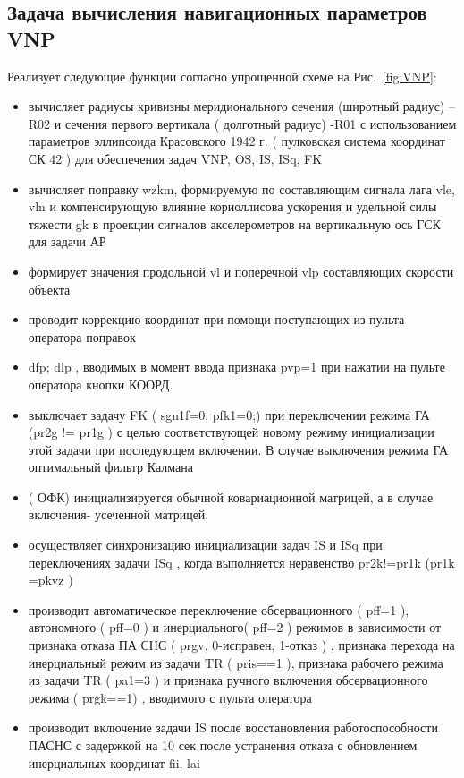 \subsection{Задача вычисления навигационных параметров VNP}
Реализует следующие функции согласно упрощенной схеме на Рис.~\ref{fig:VNP}:
\begin{itemize}
\item вычисляет радиусы кривизны  меридионального сечения (широтный радиус) –R02  и сечения первого вертикала ( долготный радиус) -R01  
    с использованием параметров эллипсоида Красовского 1942 г.  ( пулковская система координат СК 42  )  для  обеспечения   задач 
    VNP,  OS,  IS,  ISq,  FK 
    \item вычисляет  поправку   wzkm,  формируемую по  составляющим  сигнала  лага  vle,  vln  и компенсирующую  влияние кориоллисова ускорения и 
    удельной силы тяжести gk в  проекции сигналов акселерометров на вертикальную ось ГСК  для  задачи  АР 
    \item формирует значения  продольной  vl  и поперечной vlp  составляющих   скорости объекта   
    \item проводит коррекцию координат  при помощи поступающих из пульта оператора поправок
    \item dfp;  dlp  , вводимых в момент ввода признака  pvp=1  при нажатии на пульте оператора кнопки КООРД.  
    \item выключает  задачу  FK (   sgn1f=0;  pfk1=0;)  при  переключении режима  ГА (pr2g != pr1g )  с целью  соответствующей новому  режиму  
    инициализации  этой задачи при последующем включении.  В случае  выключения режима ГА  оптимальный фильтр Калмана
    \item ( ОФК)  инициализируется   обычной ковариационной матрицей, а в случае включения- усеченной матрицей.
    \item осуществляет синхронизацию  инициализации задач  IS  и ISq  при  переключениях задачи ISq , когда  выполняется неравенство   
    pr2k!=pr1k  (pr1k =pkvz )
    \item производит автоматическое переключение обсервационного  ( pff=1 ),  автономного ( pff=0 ) и  инерциального( pff=2 ) режимов  в  зависимости от 
    признака  отказа ПА СНС  ( prgv, 0-исправен,  1-отказ ) ,  признака перехода на инерциальный режим из задачи  TR  ( pris==1 ),  признака  
    рабочего режима  из задачи  TR  ( pa1=3 )  и  признака  ручного включения обсервационного режима   ( prgk==1) ,  вводимого с пульта оператора  
    \item производит    включение  задачи  IS  после   восстановления работоспособности ПАСНС с  задержкой на 10 сек  после  устранения отказа  с 
    обновлением инерциальных  координат  fii, lai 
\end{itemize}
